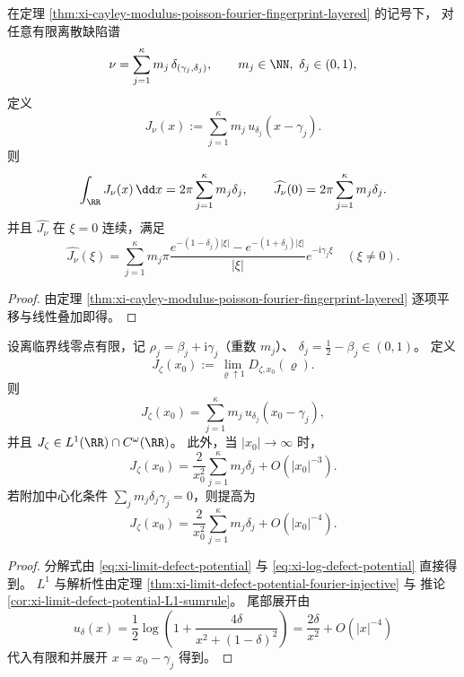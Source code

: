 \begin{corollary}[深度参数的扫描面积律与低频迹公式]\label{cor:xi-cayley-depth-scan-area-lowfreq}
在定理 \ref{thm:xi-cayley-modulus-poisson-fourier-fingerprint-layered} 的记号下，
对任意有限离散缺陷谱
\[
\nu=\sum_{j=1}^{\kappa}m_j\,\delta_{(\gamma_j,\delta_j)},
\qquad
m_j\in\NN,\ \delta_j\in(0,1),
\]
定义
\[
J_\nu(x):=\sum_{j=1}^{\kappa}m_j\,u_{\delta_j}(x-\gamma_j).
\]
则
\[
\int_{\RR}J_\nu(x)\,\dd x=2\pi\sum_{j=1}^{\kappa}m_j\delta_j,
\qquad
\widehat{J_\nu}(0)=2\pi\sum_{j=1}^{\kappa}m_j\delta_j.
\]
并且 \(\widehat{J_\nu}\) 在 \(\xi=0\) 连续，满足
\[
\widehat{J_\nu}(\xi)
=\sum_{j=1}^{\kappa}
m_j\pi\frac{e^{-(1-\delta_j)|\xi|}-e^{-(1+\delta_j)|\xi|}}{|\xi|}e^{-\mathrm{i}\gamma_j\xi}
\quad(\xi\neq 0).
\]
\end{corollary}
\begin{proof}
由定理 \ref{thm:xi-cayley-modulus-poisson-fourier-fingerprint-layered} 逐项平移与线性叠加即得。
\end{proof}

\begin{theorem}\label{thm:xi-finite-defect-endpoint-jensen-explicit-tail}
设离临界线零点有限，记 \(\rho_j=\beta_j+\mathrm{i}\gamma_j\)（重数 \(m_j\)）、
\(\delta_j=\frac12-\beta_j\in(0,1)\)。
定义
\[
J_\zeta(x_0):=\lim_{\varrho\uparrow 1}D_{\zeta,x_0}(\varrho).
\]
则
\[
J_\zeta(x_0)=\sum_{j=1}^{\kappa}m_j\,u_{\delta_j}(x_0-\gamma_j),
\]
并且 \(J_\zeta\in L^1(\RR)\cap C^\omega(\RR)\)。
此外，当 \(|x_0|\to\infty\) 时，
\[
J_\zeta(x_0)=\frac{2}{x_0^2}\sum_{j=1}^{\kappa}m_j\delta_j+O(|x_0|^{-3}).
\]
若附加中心化条件
\(
\sum_j m_j\delta_j\gamma_j=0
\)，则提高为
\[
J_\zeta(x_0)=\frac{2}{x_0^2}\sum_{j=1}^{\kappa}m_j\delta_j+O(|x_0|^{-4}).
\]
\end{theorem}
\begin{proof}
分解式由 \eqref{eq:xi-limit-defect-potential} 与
\eqref{eq:xi-log-defect-potential} 直接得到。
\(L^1\) 与解析性由定理 \ref{thm:xi-limit-defect-potential-fourier-injective} 与
推论 \ref{cor:xi-limit-defect-potential-L1-sumrule}。
尾部展开由
\[
u_\delta(x)=\frac12\log\!\left(1+\frac{4\delta}{x^2+(1-\delta)^2}\right)
=\frac{2\delta}{x^2}+O(|x|^{-4})
\]
代入有限和并展开 \(x=x_0-\gamma_j\) 得到。
\end{proof}

